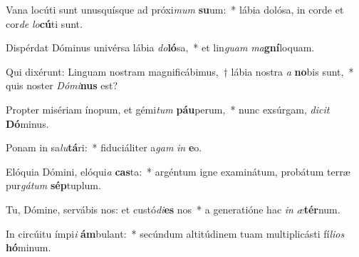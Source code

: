 \item Vana locúti sunt unusquísque ad próxi\textit{mum} \textbf{su}um:~* lábia dolósa, in corde et cor\textit{de} \textit{lo}\textbf{cú}ti sunt.
\item Dispérdat Dóminus univérsa lábia \textit{do}\textbf{ló}sa,~* et lin\textit{guam} \textit{ma}\textbf{gní}loquam.
\item Qui dixérunt: Linguam nostram magnificábimus,~† lábia nostra \textit{a} \textbf{no}bis sunt,~* quis noster \textit{Dó}\textit{mi}\textbf{nus} est?
\item Propter misériam ínopum, et gémi\textit{tum} \textbf{páu}perum,~* nunc exsúrgam, \textit{di}\textit{cit} \textbf{Dó}minus.
\item Ponam in sa\textit{lu}\textbf{tá}ri:~* fiduciáliter a\textit{gam} \textit{in} \textbf{e}o.
\item Elóquia Dómini, elóqui\textit{a} \textbf{cas}ta:~* argéntum igne examinátum, probátum terræ pur\textit{gá}\textit{tum} \textbf{sép}tuplum.
\item Tu, Dómine, servábis nos: et custó\textit{di}\textbf{es} nos~* a generatióne hac \textit{in} \textit{æ}\textbf{tér}num.
\item In circúitu ímpi\textit{i} \textbf{ám}bulant:~* secúndum altitúdinem tuam multiplicásti fí\textit{li}\textit{os} \textbf{hó}minum.
